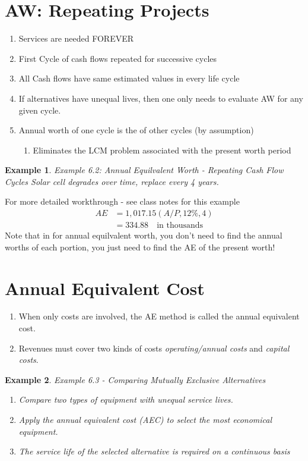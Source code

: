 \documentclass{report} %
\newtheorem{exmp}{Example}
\begin{document}
\section*{AW: Repeating Projects}
\begin{enumerate}
    \item Services are needed FOREVER
    \item First Cycle of cash flows repeated for successive cycles
    \item All Cash flows have same estimated values in every life cycle
    \item If alternatives have unequal lives, then one only needs to evaluate AW for any given cycle.
    \item Annual worth of one cycle is the of other cycles (by assumption)
        \begin{enumerate}
            \item Eliminates the LCM problem associated with the present worth period
        \end{enumerate}
\end{enumerate}
\begin{exmp}
    Example 6.2: Annual Equilvalent Worth - Repeating Cash Flow Cycles
    Solar cell degrades over time, replace every 4 years.
\end{exmp}
For more detailed workthrough - see class notes for this example
\begin{equation*}
    \begin{aligned}
        AE &= 1,017.15(A/P, 12\%,4) \\
            &= 334.88 \quad \text{in thousands}
    \end{aligned}
\end{equation*}
Note that in for annual equilvalent worth, you don't need to find the annual worths of each portion, you just need to find the AE of the present worth!

\section*{Annual Equivalent Cost}
\begin{enumerate}
    \item When only costs are involved, the AE method is called the annual equivalent cost.
    \item Revenues must cover two kinds of costs \emph{operating/annual costs} and \emph{capital costs}.
\end{enumerate}
\begin{exmp}
    Example 6.3 - Comparing Mutually Exclusive Alternatives
    \begin{enumerate}
        \item Compare two types of equipment with unequal service lives.
        \item Apply the annual equivalent cost (AEC) to select the most economical equipment.
        \item The service life of the selected alternative is required on a continuous basis 
    \end{enumerate}
\end{exmp}
\end{document}
